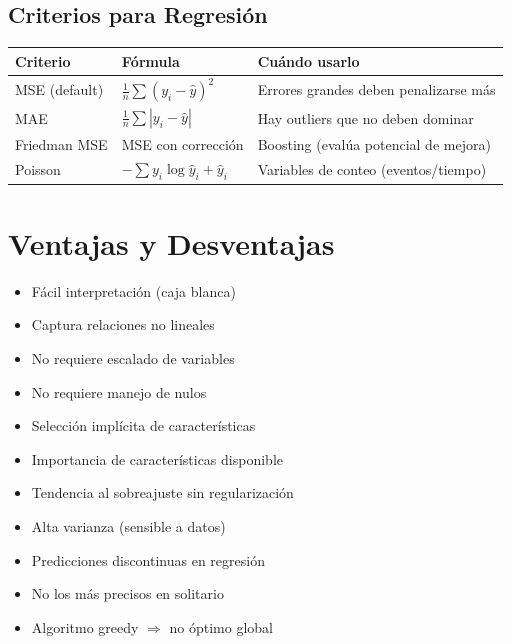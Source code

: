 \documentclass[11pt, a4paper]{book}
\begin{document}
\subsection{Criterios para Regresión}

\begin{center}
  \begin{tabular}{llp{5cm}}
    \toprule
    \textbf{Criterio} & \textbf{Fórmula} & \textbf{Cuándo usarlo}\\
    \midrule
    MSE (default) & $\frac{1}{n}\sum(y_i - \hat{y})^2$ & Errores grandes deben penalizarse más\\
    MAE & $\frac{1}{n}\sum|y_i - \hat{y}|$ & Hay outliers que no deben dominar\\
    Friedman MSE & MSE con corrección & Boosting (evalúa potencial de mejora)\\
    Poisson & $-\sum y_i \log\hat{y}_i + \hat{y}_i$ & Variables de conteo (eventos/tiempo)\\
    \bottomrule
  \end{tabular}
\end{center}

\section{Ventajas y Desventajas}

\begin{minipage}[t]{0.48\textwidth}
  \begin{tcolorbox}[colback=successbg, colframe=treegreen, title={\faCheck\ Ventajas}]
    \begin{itemize}[noitemsep]
      \item Fácil interpretación (caja blanca)
      \item Captura relaciones no lineales
      \item No requiere escalado de variables
      \item No requiere manejo de nulos
      \item Selección implícita de características
      \item Importancia de características disponible
    \end{itemize}
  \end{tcolorbox}
\end{minipage}
\hfill
\begin{minipage}[t]{0.48\textwidth}
  \begin{tcolorbox}[colback=critbg, colframe=accent, title={\faTimes\ Desventajas}]
    \begin{itemize}[noitemsep]
      \item Tendencia al sobreajuste sin regularización
      \item Alta varianza (sensible a datos)
      \item Predicciones discontinuas en regresión
      \item No los más precisos en solitario
      \item Algoritmo greedy $\Rightarrow$ no óptimo global
    \end{itemize}
  \end{tcolorbox}
\end{minipage}
\end{document}
